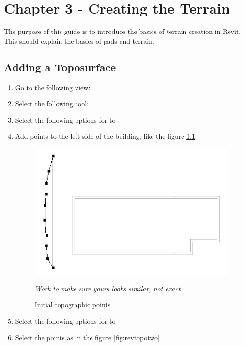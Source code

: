 \documentclass{tufte-book} %
\begin{document}
\chapter{Chapter 3 - Creating the Terrain}
\label{ch:3}
The purpose of this guide is to introduce the basics of terrain creation in Revit. This should explain the basics of pads and terrain.
\section{Adding a Toposurface}
\begin{enumerate}
	\item Go to the following view: 
	\item Select the following tool: 
	\item Select the following options for  to 
	\item Add points to the left side of the building, like the figure \ref{fig:revtopoinit}
	\begin{figure}
		\includegraphics[width=\linewidth]{revittopographicinitial.png}
		\caption{Initial topographic points}
		\emph{Work to make sure yours looks similar, not exact}
		\label{fig:revtopoinit}
	\end{figure}
	\item Select the following options for  to 
	\item Select the points as in the figure \ref{fig:revtopotwo}
	\begin{figure}

\end{figure}
\end{enumerate}
\end{document}
